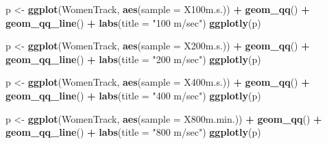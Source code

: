 \documentclass[
]{article}
\newenvironment{Shaded}{\begin{snugshade}}{\end{snugshade}}
\newcommand{\DataTypeTok}[1]{\textcolor[rgb]{0.13,0.29,0.53}{#1}}
\newcommand{\KeywordTok}[1]{\textcolor[rgb]{0.13,0.29,0.53}{\textbf{#1}}}
\newcommand{\NormalTok}[1]{#1}
\newcommand{\OperatorTok}[1]{\textcolor[rgb]{0.81,0.36,0.00}{\textbf{#1}}}
\newcommand{\StringTok}[1]{\textcolor[rgb]{0.31,0.60,0.02}{#1}}
\begin{document}
\begin{Shaded}
\begin{Highlighting}[]
\NormalTok{p <-}\StringTok{ }\KeywordTok{ggplot}\NormalTok{(WomenTrack, }\KeywordTok{aes}\NormalTok{(}\DataTypeTok{sample =}\NormalTok{ X100m.s.)) }\OperatorTok{+}\StringTok{ }\KeywordTok{geom_qq}\NormalTok{() }\OperatorTok{+}\StringTok{ }\KeywordTok{geom_qq_line}\NormalTok{() }\OperatorTok{+}\StringTok{ }\KeywordTok{labs}\NormalTok{(}\DataTypeTok{title =} \StringTok{"100 m/sec"}\NormalTok{)}
\KeywordTok{ggplotly}\NormalTok{(p)}
\end{Highlighting}
\end{Shaded}

\begin{Shaded}
\begin{Highlighting}[]
\NormalTok{p <-}\StringTok{ }\KeywordTok{ggplot}\NormalTok{(WomenTrack, }\KeywordTok{aes}\NormalTok{(}\DataTypeTok{sample =}\NormalTok{ X200m.s.)) }\OperatorTok{+}\StringTok{ }\KeywordTok{geom_qq}\NormalTok{() }\OperatorTok{+}\StringTok{ }\KeywordTok{geom_qq_line}\NormalTok{() }\OperatorTok{+}\StringTok{ }\KeywordTok{labs}\NormalTok{(}\DataTypeTok{title =} \StringTok{"200 m/sec"}\NormalTok{)}
\KeywordTok{ggplotly}\NormalTok{(p)}
\end{Highlighting}
\end{Shaded}

\begin{Shaded}
\begin{Highlighting}[]
\NormalTok{p <-}\StringTok{ }\KeywordTok{ggplot}\NormalTok{(WomenTrack, }\KeywordTok{aes}\NormalTok{(}\DataTypeTok{sample =}\NormalTok{ X400m.s.)) }\OperatorTok{+}\StringTok{ }\KeywordTok{geom_qq}\NormalTok{() }\OperatorTok{+}\StringTok{ }\KeywordTok{geom_qq_line}\NormalTok{() }\OperatorTok{+}\StringTok{ }\KeywordTok{labs}\NormalTok{(}\DataTypeTok{title =} \StringTok{"400 m/sec"}\NormalTok{)}
\KeywordTok{ggplotly}\NormalTok{(p)}
\end{Highlighting}
\end{Shaded}

\begin{Shaded}
\begin{Highlighting}[]
\NormalTok{p <-}\StringTok{ }\KeywordTok{ggplot}\NormalTok{(WomenTrack, }\KeywordTok{aes}\NormalTok{(}\DataTypeTok{sample =}\NormalTok{ X800m.min.)) }\OperatorTok{+}\StringTok{ }\KeywordTok{geom_qq}\NormalTok{() }\OperatorTok{+}\StringTok{ }\KeywordTok{geom_qq_line}\NormalTok{() }\OperatorTok{+}\StringTok{ }\KeywordTok{labs}\NormalTok{(}\DataTypeTok{title =} \StringTok{"800 m/sec"}\NormalTok{)}
\KeywordTok{ggplotly}\NormalTok{(p)}
\end{Highlighting}
\end{Shaded}
\end{document}
